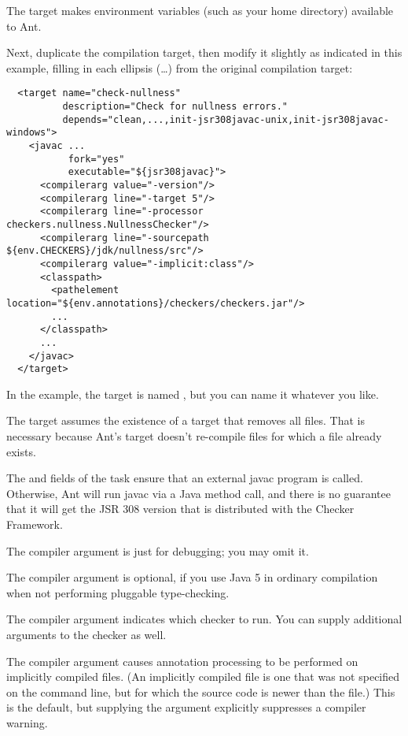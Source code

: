 \noindent
The  target makes environment variables (such as your home
directory) available to Ant.

Next, duplicate the compilation target, then modify it slightly as
indicated in this example, filling in each ellipsis (\ldots) from the
original compilation target:

\begin{smaller}
\begin{Verbatim}
  <target name="check-nullness"
          description="Check for nullness errors."
          depends="clean,...,init-jsr308javac-unix,init-jsr308javac-windows">
    <javac ...
           fork="yes"
           executable="${jsr308javac}">
      <compilerarg value="-version"/>
      <compilerarg line="-target 5"/>
      <compilerarg line="-processor checkers.nullness.NullnessChecker"/>
      <compilerarg line="-sourcepath ${env.CHECKERS}/jdk/nullness/src"/>
      <compilerarg value="-implicit:class"/>
      <classpath>
        <pathelement location="${env.annotations}/checkers/checkers.jar"/>
        ...
      </classpath>
      ...
    </javac>
  </target>
\end{Verbatim}
\end{smaller}

In the example, the target is named , but you can
name it whatever you like.

The target assumes the existence of a  target that removes all
 files.  That is necessary because Ant's  target
doesn't re-compile  files for which a  file
already exists.

The  and  fields of the  task
ensure that an external javac program is called.  Otherwise, Ant will run
javac via a Java method call, and there is no guarantee that it will get
the JSR 308 version that is distributed with the Checker Framework.

The  compiler argument is just for debugging; you may omit
it.

The  compiler argument is optional, if you use Java 5 in
ordinary compilation when not performing pluggable type-checking.

The  compiler argument indicates which checker to
run.  You can supply additional arguments to the checker as well.

The  compiler argument causes annotation processing
to be performed on implicitly compiled files.  (An implicitly compiled file
is one that was not specified on the command line, but for which the source
code is newer than the  file.)  This is the default, but
supplying the argument explicitly suppresses a compiler warning.


